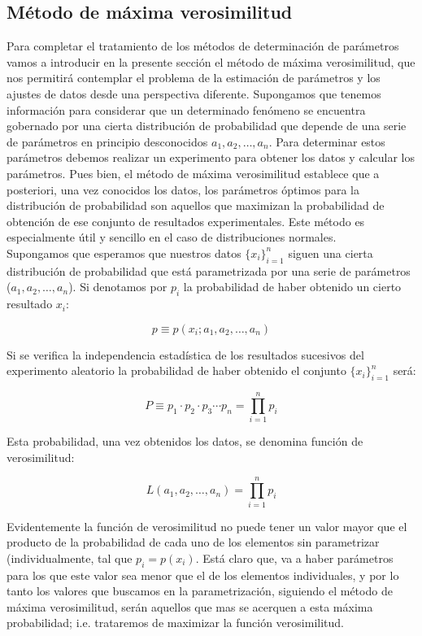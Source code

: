 \documentclass[12pt,a4paper]{book}
\begin{document}
\subsection{Método de máxima verosimilitud}
Para completar el tratamiento de los métodos de determinación de parámetros vamos a introducir en la presente sección el método de máxima verosimilitud, que nos permitirá contemplar el problema de la estimación de parámetros y los ajustes de datos desde una perspectiva diferente. Supongamos que tenemos información para considerar que un determinado fenómeno se encuentra gobernado por una cierta distribución de probabilidad que depende de una serie de parámetros en principio desconocidos $a_1,a_2,\ldots,a_n$. Para determinar estos parámetros debemos realizar un experimento para obtener los datos y calcular los parámetros. Pues bien, el método de máxima verosimilitud establece que a posteriori, una vez conocidos los datos, los parámetros óptimos para la distribución de probabilidad son aquellos que maximizan la probabilidad de obtención de ese conjunto de resultados experimentales. Este método es especialmente útil y sencillo en el caso de distribuciones normales.  \\

Supongamos que esperamos que nuestros datos $\{ x_i \}_{i=1}^n$ siguen una cierta distribución de probabilidad que está parametrizada por una serie de parámetros ($a_1,a_2,\ldots,a_n$). Si denotamos por $p_i$ la probabilidad de haber obtenido un cierto resultado $x_i$:

\begin{equation}
p \equiv p(x_i;a_1,a_2, \ldots, a_n)
\end{equation}

Si se verifica la independencia estadística de los resultados sucesivos del experimento aleatorio la probabilidad de haber obtenido el conjunto $\{ x_i \}_{i=1}^n$ será: 

\begin{equation}
P \equiv p_1 \cdot p_2 \cdot p_3 \cdots p_n = \prod_{i=1}^n p_i
\end{equation}

Esta probabilidad, una vez obtenidos los datos, se denomina función de verosimilitud:

\begin{equation}
L (a_1,a_2, \ldots, a_n) = \prod_{i=1}^n p_i
\end{equation}

Evidentemente la función de verosimilitud no puede tener un valor mayor que el producto de la probabilidad de cada uno de los elementos sin parametrizar (individualmente, tal que $p_i = p(x_i)$. Está claro que, va a haber parámetros para los que este valor sea menor que el de los elementos individuales, y por lo tanto los valores que buscamos en la parametrización, siguiendo el método de máxima verosimilitud, serán aquellos que mas se acerquen a esta máxima probabilidad; i.e. trataremos de maximizar la función verosimilitud. 
\end{document}

